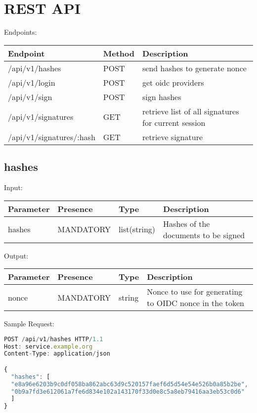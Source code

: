 \section{REST API}
Endpoints:

\begin{tabular}{|l|l|l|}
	\hline
	Endpoint & Method & Description \\ \hline
	/api/v1/hashes & POST & send hashes to generate nonce \\ \hline
	/api/v1/login & POST & get oidc providers \\ \hline
	/api/v1/sign & POST & sign hashes \\ \hline
	/api/v1/signatures & GET & retrieve list of all signatures for current session \\ \hline
	/api/v1/signatures/:hash & GET & retrieve signature \\ \hline
\end{tabular}

\subsection{hashes}
Input:

\begin{tabular}{|l|l|l|l|}
	\hline
	Parameter & Presence & Type & Description \\ \hline
	hashes & MANDATORY & list(string) & Hashes of the documents to be signed \\ \hline
\end{tabular}

Output:

\begin{tabular}{|l|l|l|l|}
	\hline
	Parameter & Presence & Type & Description \\ \hline
	nonce & MANDATORY & string & Nonce to use for generating to OIDC nonce in the token \\ \hline
\end{tabular}

Sample Request:
\begin{lstlisting}[caption={hashes request}, captionpos=b, language=JavaScript, label={lst:hashesrequest}]
POST /api/v1/hashes HTTP/1.1
Host: service.example.org
Content-Type: application/json

{
  "hashes": [
  "e8a96e6203b9c0df058ba862abc63d9c520157faef6d5d54e54e526b0a85b2be",
  "0b9a7fd3e612061a7fe6d834e102a143170f33d0e8c5a8eb79416aa3eb53c0d6"
  ]
}
\end{lstlisting}

